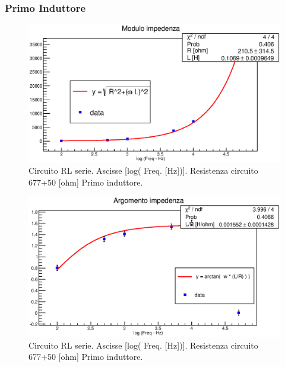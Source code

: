 \break
\subsubsection*{Primo Induttore}

\begin{figure}[H]
\centering
\includegraphics[scale=0.7]{Grafici/C3_P1_ModImp_ind1.eps}
\caption{
Circuito RL serie.
Ascisse [log( Freq. [Hz])].
Resistenza circuito 677+50 [ohm]
Primo induttore.
}
\label{fig:C3_P1_ModImp_ind1}
\end{figure}

\begin{figure}[H]
\centering
\includegraphics[scale=0.7]{Grafici/C3_P1_ArgImp_ind1.eps}
\caption{
Circuito RL serie.
Ascisse [log( Freq. [Hz])].
Resistenza circuito 677+50 [ohm]
Primo induttore.
}
\label{fig:C3_P1_ArgImp_ind1}
\end{figure}

